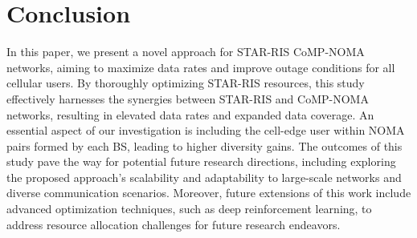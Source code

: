 \documentclass[conference]{IEEEtran}
\begin{document}
\section{Conclusion}
In this paper, we present a novel approach for STAR-RIS CoMP-NOMA networks, aiming to maximize data rates and improve outage conditions for all cellular users. By thoroughly optimizing STAR-RIS resources, this study effectively harnesses the synergies between STAR-RIS and CoMP-NOMA networks, resulting in elevated data rates and expanded data coverage. An essential aspect of our investigation is including the cell-edge user within NOMA pairs formed by each BS, leading to higher diversity gains. The outcomes of this study pave the way for potential future research directions, including exploring the proposed approach's scalability and adaptability to large-scale networks and diverse communication scenarios. Moreover, future extensions of this work include advanced optimization techniques, such as deep reinforcement learning, to address resource allocation challenges for future research endeavors.



\end{document}
